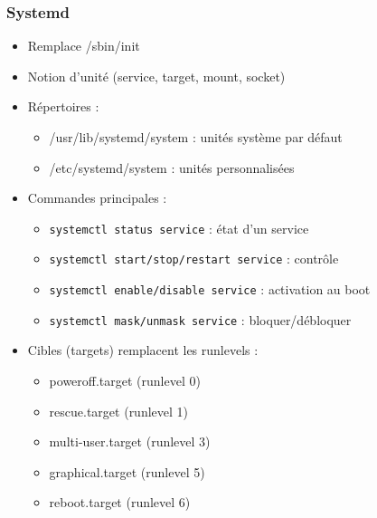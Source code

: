 \documentclass[12pt,a4paper]{article}
\begin{document}
\subsubsection{Systemd}
\begin{itemize}
    \item Remplace /sbin/init %
    \item Notion d'unit\'e (service, target, mount, socket) %
    \item R\'epertoires :
    \begin{itemize}
        \item /usr/lib/systemd/system : unit\'es syst\`eme par d\'efaut %
        \item /etc/systemd/system : unit\'es personnalis\'ees %
    \end{itemize}
    \item Commandes principales :
    \begin{itemize}
        \item \texttt{systemctl status service} : \'etat d'un service %
        \item \texttt{systemctl start/stop/restart service} : contr\^ole %
        \item \texttt{systemctl enable/disable service} : activation au boot %
        \item \texttt{systemctl mask/unmask service} : bloquer/d\'ebloquer %
    \end{itemize}
    \item Cibles (targets) remplacent les runlevels :
    \begin{itemize}
        \item poweroff.target (runlevel 0) %
        \item rescue.target (runlevel 1) %
        \item multi-user.target (runlevel 3) %
        \item graphical.target (runlevel 5) %
        \item reboot.target (runlevel 6) %
    \end{itemize}
\end{itemize}
\end{document}
